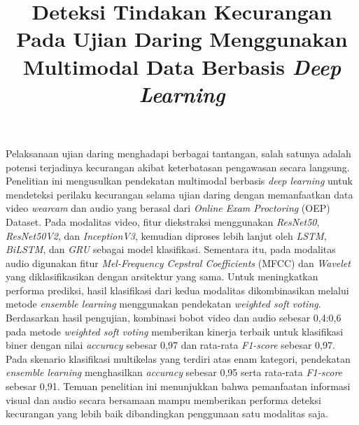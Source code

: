 \documentclass {rapidsart}
\theoremstyle{plain}
\theoremstyle{remark}
\theoremstyle{definition}
\begin{document}
\begin{frontmatter}

\title{Deteksi Tindakan Kecurangan Pada Ujian Daring Menggunakan Multimodal Data Berbasis \textit{Deep Learning}}

\author[1]{ 
}

\author[2]{ }


\address[1]{
,
}
\address[2]{
,
}

\begin{abstrak}
    Pelaksanaan ujian daring menghadapi berbagai tantangan, salah satunya adalah potensi terjadinya kecurangan akibat keterbatasan pengawasan secara langsung. Penelitian ini mengusulkan pendekatan multimodal berbasis \textit{deep learning} untuk mendeteksi perilaku kecurangan selama ujian daring dengan memanfaatkan data video \textit{wearcam} dan audio yang berasal dari \textit{Online Exam Proctoring} (OEP) Dataset. Pada modalitas video, fitur diekstraksi menggunakan \textit{ResNet50}, \textit{ResNet50V2}, dan \textit{InceptionV3}, kemudian diproses lebih lanjut oleh \textit{LSTM}, \textit{BiLSTM}, dan \textit{GRU} sebagai model klasifikasi. Sementara itu, pada modalitas audio digunakan fitur \textit{Mel-Frequency Cepstral Coefficients} (MFCC) dan \textit{Wavelet} yang diklasifikasikan dengan arsitektur yang sama. Untuk meningkatkan performa prediksi, hasil klasifikasi dari kedua modalitas dikombinasikan melalui metode \textit{ensemble learning} menggunakan pendekatan \textit{weighted soft voting}. Berdasarkan hasil pengujian, kombinasi bobot video dan audio sebesar 0,4:0,6 pada metode \textit{weighted soft voting} memberikan kinerja terbaik untuk klasifikasi biner dengan nilai \textit{accuracy} sebesar 0,97 dan rata-rata \textit{F1-score} sebesar 0,97. Pada skenario klasifikasi multikelas yang terdiri atas enam kategori, pendekatan \textit{ensemble learning} menghasilkan \textit{accuracy} sebesar 0,95 serta rata-rata \textit{F1-score} sebesar 0,91. Temuan penelitian ini menunjukkan bahwa pemanfaatan informasi visual dan audio secara bersamaan mampu memberikan performa deteksi kecurangan yang lebih baik dibandingkan penggunaan satu modalitas saja.
\end{abstrak}




\end{frontmatter}
\end{document}
